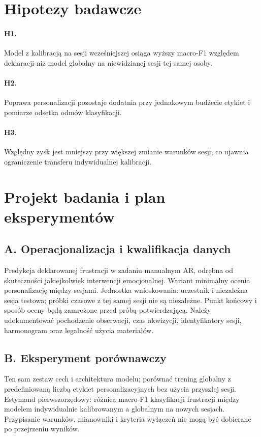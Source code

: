 \documentclass[11pt,a4paper]{article}
\begin{document}
\section{Hipotezy badawcze}
\paragraph{H1.} Model z kalibracją na sesji wcześniejszej osiąga wyższy macro-F1 względem deklaracji niż model globalny na niewidzianej sesji tej samej osoby.
\paragraph{H2.} Poprawa personalizacji pozostaje dodatnia przy jednakowym budżecie etykiet i pomiarze odsetka odmów klasyfikacji.
\paragraph{H3.} Względny zysk jest mniejszy przy większej zmianie warunków sesji, co ujawnia ograniczenie transferu indywidualnej kalibracji.

\section{Projekt badania i plan eksperymentów}
\subsection{A. Operacjonalizacja i kwalifikacja danych}
Predykcja deklarowanej frustracji w zadaniu manualnym AR, odrębna od skuteczności jakiejkolwiek interwencji emocjonalnej. Wariant minimalny ocenia personalizację między sesjami. Jednostka wnioskowania: uczestnik i niezależna sesja testowa; próbki czasowe z tej samej sesji nie są niezależne. Punkt końcowy i sposób oceny będą zamrożone przed próbą potwierdzającą. Należy udokumentować pochodzenie obserwacji, czas akwizycji, identyfikatory sesji, harmonogram oraz legalność użycia materiałów.

\subsection{B. Eksperyment porównawczy}
Ten sam zestaw cech i architektura modelu; porównać trening globalny z predefiniowaną liczbą etykiet personalizacyjnych bez użycia przyszłej sesji. Estymand pierwszorzędowy: różnica macro-F1 klasyfikacji frustracji między modelem indywidualnie kalibrowanym a globalnym na nowych sesjach. Przypisanie warunków, mianowniki i kryteria wyłączeń nie mogą być dobierane po przejrzeniu wyników.
\end{document}
